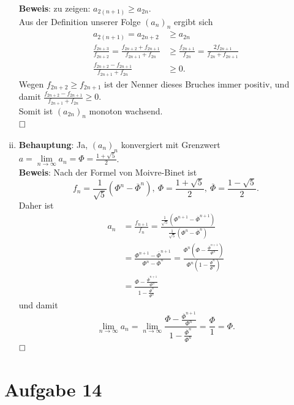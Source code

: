 \documentclass[12pt,a4paper]{article}
\newcommand{\qed}{\null\nobreak\hfill\square}
\begin{document}
\begin{enumerate}[(i)]
    \textbf{Beweis}: zu zeigen: $a_{2(n+1)} \geq a_{2n}$.\\
    Aus der Definition unserer Folge $(a_n)_n$ ergibt sich
    \begin{align*}
        a_{2(n+1)} = a_{2n+2} &\geq a_{2n}\\
        \frac{f_{2n+3}}{f_{2n+2}} = \frac{f_{2n+2} + f_{2n+1}}{f_{2n+1} + f_{2n}} &\geq \frac{f_{2n+1}}{f_{2n}} = \frac{2 f_{2n+1}}{f_{2n} + f_{2n+1}}\\
        \frac{f_{2n+2} - f_{2n+1}}{f_{2n+1} + f_{2n}} &\geq 0.
    \end{align*}
    Wegen $f_{2n+2} \geq f_{2n+1}$ ist der Nenner dieses Bruches immer positiv, und damit $\frac{f_{2n+2} - f_{2n+1}}{f_{2n+1} + f_{2n}} \geq 0$.\\
    Somit ist $(a_{2n})_n$ monoton wachsend.\\
    $\qed$

    \item \textbf{Behauptung}: Ja, $(a_n)_n$ konvergiert mit Grenzwert $a = \lim\limits_{n \to \infty} a_n = \Phi = \frac{1 + \sqrt{5}}{2}$.\\

    \textbf{Beweis}: Nach der Formel von Moivre-Binet ist
    $$f_n = \frac{1}{\sqrt{5}} \left(\Phi^n - \overline{\Phi}^n\right),\ \Phi = \frac{1 + \sqrt{5}}{2},\ \overline{\Phi} = \frac{1 - \sqrt{5}}{2}.$$
    Daher ist
    \begin{align*}
        a_n &= \frac{f_{n+1}}{f_n} = \frac{\frac{1}{\sqrt{5}}\left(\Phi^{n+1} - \overline{\Phi}^{n+1}\right)}{\frac{1}{\sqrt{5}}\left(\Phi^n - \overline{\Phi}^n\right)}\\
        &=\frac{\Phi^{n+1} - \overline{\Phi}^{n+1}}{\Phi^n - \overline{\Phi}^n}
        = \frac{\Phi^n \left(\Phi - \frac{\overline{\Phi}^{n+1}}{\Phi^n}\right)}{\Phi^n \left(1 - \frac{\overline{\Phi}^n}{\Phi^n}\right)}\\
        &= \frac{\Phi - \frac{\overline{\Phi}^{n+1}}{\Phi^n}}{1 - \frac{\overline{\Phi}^n}{\Phi^n}}
    \end{align*}
    und damit
    $$\lim\limits_{n \to \infty} a_n = \lim\limits_{n \to \infty} \frac{\Phi - \frac{\overline{\Phi}^{n+1}}{\Phi^n}}{1 - \frac{\overline{\Phi}^n}{\Phi^n}} = \frac{\Phi}{1} = \Phi.$$
    $\qed$
\end{enumerate}


\section*{Aufgabe 14}
\end{document}
